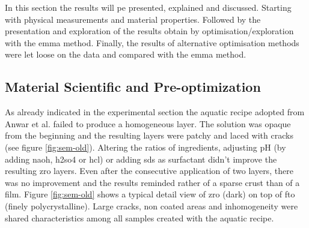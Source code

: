 In this section the results will pe presented, explained and discussed. 
Starting with physical measurements and material properties. 
Followed by the presentation and exploration of the results obtain by optimisation/exploration  with the \gls{emma} method. 
Finally, the results of alternative optimisation methods were let loose on the data and compared with the \gls{emma} method. 

\subsection{Material Scientific and Pre-optimization}
\label{sec:res-mat}
As already indicated in the experimental section the aquatic recipe adopted from Anwar et al.\cite{Anwar2017} failed to produce a homogeneous layer. 
The solution was opaque from the beginning and the resulting layers were patchy and laced with cracks (see figure \ref{fig:sem-old}). 
Altering the ratios of ingredients, adjusting pH (by adding \gls{naoh}, \gls{h2so4} or \gls{hcl}) or adding \gls{sds} as surfactant didn't improve the resulting \gls{zro} layers. 
Even after the consecutive application of two layers, there was no improvement and the results reminded rather of a sparse crust than of a film. 
%
Figure \ref{fig:sem-old} shows a typical detail view of \gls{zro} (dark) on top of \gls{fto} (finely polycrystalline). 
Large cracks, non coated areas and inhomogeneity were 
shared characteristics among 
all samples created with the aquatic recipe. 

